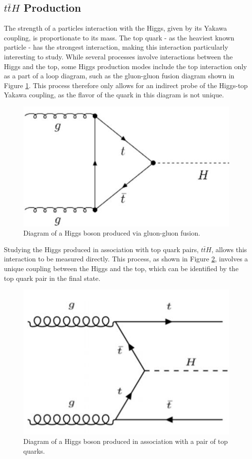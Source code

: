 
\subsection{$t\bar{t}H$ Production}
\label{sec:ttH_theory}

The strength of a particles interaction with the Higgs, given by its Yakawa coupling, is proportionate to its mass. The top quark - as the heaviest known particle - has the strongest interaction, making this interaction particularly interesting to study. While several processes involve interactions between the Higgs and the top, some Higgs production modes include the top interaction only as a part of a loop diagram, such as the gluon-gluon fusion diagram shown in Figure \ref{fig:Hgg}. This process therefore only allows for an indirect probe of the Higgs-top Yakawa coupling, as the flavor of the quark in this diagram is not unique.

\begin{figure}[H]
\centering                                                                                                                
   \includegraphics[width=0.6\linewidth]{figures/theory/Hgg.JPG}
\caption{Diagram of a Higgs boson produced via gluon-gluon fusion.}
\label{fig:Hgg}
\end{figure}

Studying the Higgs produced in association with top quark pairs, $t\bar{t}H$, allows this interaction to be measured directly. This process, as shown in Figure \ref{fig:ttH_diagram}, involves a unique coupling between the Higgs and the top, which can be identified by the top quark pair in the final state.

\begin{figure}[H]
\centering
   \includegraphics[width=0.6\linewidth]{figures/theory/ttH_diagram.JPG}
\caption{Diagram of a Higgs boson produced in association with a pair of top quarks.}                         
\label{fig:ttH_diagram}                                                                                    
\end{figure}

